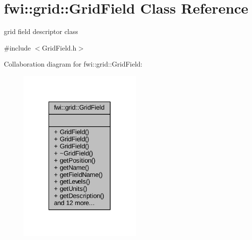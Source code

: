 \hypertarget{classfwi_1_1grid_1_1GridField}{\section{fwi\-:\-:grid\-:\-:Grid\-Field Class Reference}
\label{classfwi_1_1grid_1_1GridField}
}


grid field descriptor class  




{\ttfamily \#include $<$Grid\-Field.\-h$>$}



Collaboration diagram for fwi\-:\-:grid\-:\-:Grid\-Field\-:\nopagebreak
\begin{figure}[H]
\begin{center}
\leavevmode
\includegraphics[width=174pt]{classfwi_1_1grid_1_1GridField__coll__graph}
\end{center}
\end{figure}
